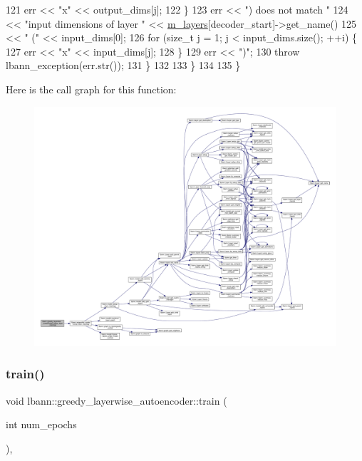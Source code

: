 \begin{DoxyCode}
121         err << \textcolor{stringliteral}{"x"} << output\_dims[j];
122       \}
123       err << \textcolor{stringliteral}{") does not match "}
124           << \textcolor{stringliteral}{"input dimensions of layer "} << \hyperlink{classlbann_1_1model_a0229fc226ec163d1411548446104569d}{m\_layers}[decoder\_start]->get\_name()
125           << \textcolor{stringliteral}{" ("} << input\_dims[0];
126       \textcolor{keywordflow}{for} (\textcolor{keywordtype}{size\_t} j = 1; j < input\_dims.size(); ++i) \{
127         err << \textcolor{stringliteral}{"x"} << input\_dims[j];
128       \}
129       err << \textcolor{stringliteral}{")"};
130       \textcolor{keywordflow}{throw} lbann\_exception(err.str());
131     \}
132 
133   \}
134 
135 \}
\end{DoxyCode}
Here is the call graph for this function\+:\nopagebreak
\begin{figure}[H]
\begin{center}
\leavevmode
\includegraphics[width=350pt]{classlbann_1_1greedy__layerwise__autoencoder_a115607e435ae4685531a81852ce01fe7_cgraph}
\end{center}
\end{figure}
\mbox{\label{classlbann_1_1greedy__layerwise__autoencoder_a085f0b2debb82d9c4927a1c8b11dd353}} 
\subsubsection{\texorpdfstring{train()}{train()}}
{\footnotesize\ttfamily void lbann\+::greedy\+\_\+layerwise\+\_\+autoencoder\+::train (\begin{DoxyParamCaption}\item[{int}]{num\+\_\+epochs }\end{DoxyParamCaption})\hspace{0.3cm}{\ttfamily [override]}, {\ttfamily [virtual]}}

